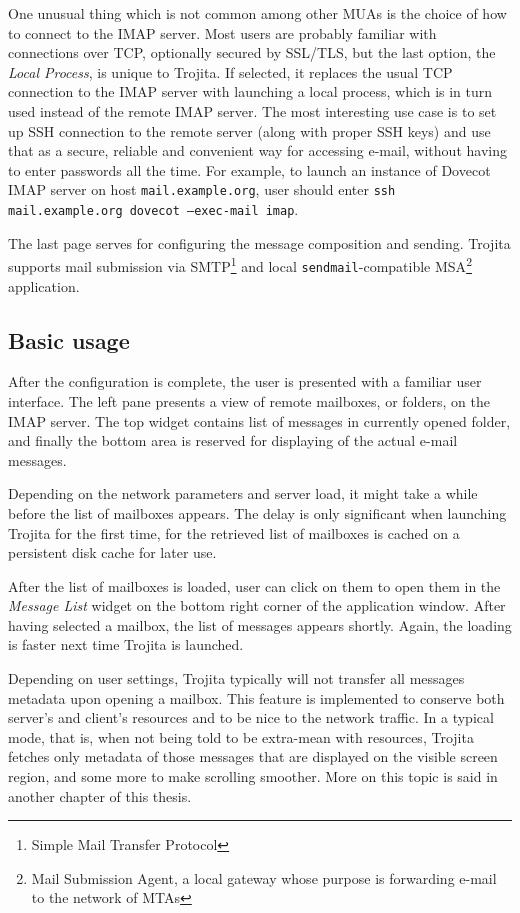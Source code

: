 \documentclass[12pt,notitlepage]{report}
\newcommand{\trojita}{Trojita\xspace}
\begin{document}
One unusual thing which is not common among other MUAs is the choice of how to
connect to the IMAP server.  Most users are probably familiar with connections
over TCP, optionally secured by SSL/TLS, but the last option, the {\em Local
Process}, is unique to \trojita. If selected, it replaces the usual TCP
connection to the IMAP server with launching a local process, which is in turn
used instead of the remote IMAP server. The most interesting use case is to set
up SSH connection to the remote server (along with proper SSH keys) and use that
as a secure, reliable and convenient way for accessing e-mail, without having to
enter passwords all the time. For example, to launch an instance of Dovecot IMAP
server on host {\tt mail.example.org}, user should enter {\tt ssh
mail.example.org dovecot --exec-mail imap}.

The last page serves for configuring the message composition and sending.
\trojita supports mail submission via SMTP\footnote{Simple Mail Transfer
Protocol} and local {\tt sendmail}-compatible MSA\footnote{Mail Submission
Agent\cite{rfc-msa}, a local gateway whose purpose is forwarding e-mail to the
network of MTAs} application.

\subsection{Basic usage}

After the configuration is complete, the user is presented with a familiar user
interface. The left pane presents a view of remote mailboxes, or folders, on the
IMAP server. The top widget contains list of messages in currently opened
folder, and finally the bottom area is reserved for displaying of the actual
e-mail messages.

Depending on the network parameters and server load, it might take a while
before the list of mailboxes appears. The delay is only significant when
launching \trojita for the first time, for the retrieved list of mailboxes is
cached on a persistent disk cache for later use.

After the list of mailboxes is loaded, user can click on them to open them in
the {\em Message List} widget on the bottom right corner of the application
window.  After having selected a mailbox, the list of messages appears shortly.
Again, the loading is faster next time \trojita is launched.

Depending on user settings, \trojita typically will not transfer all messages
metadata upon opening a mailbox.  This feature is implemented to conserve
both server's and client's resources and to be nice to the network traffic.  In
a typical mode, that is, when not being told to be extra-mean with resources,
\trojita fetches only metadata of those messages that are displayed on the
visible screen region, and some more to make scrolling smoother.  More on this
topic is said in another chapter of this thesis.
\end{document}
